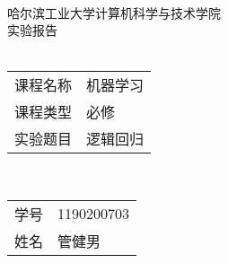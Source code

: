 \begin{center}
    \quad \vspace{3cm} \\
    \Large
    哈尔滨工业大学计算机科学与技术学院 \\
    
    \Huge
    实验报告 \\
    \quad \vspace{1cm} \\
    
    \Large
    \begin{tabular}{r@{：}l}
        课程名称 & 机器学习 \\
        课程类型 & 必修 \\
        实验题目 & 逻辑回归 \\
    \end{tabular}
    \quad \vspace{1cm} \\
    
    \large
    \begin{tabular}{r@{：}l}
    学号 & 1190200703 \\
    姓名 & 管健男 \\
    \end{tabular}

\end{center}
